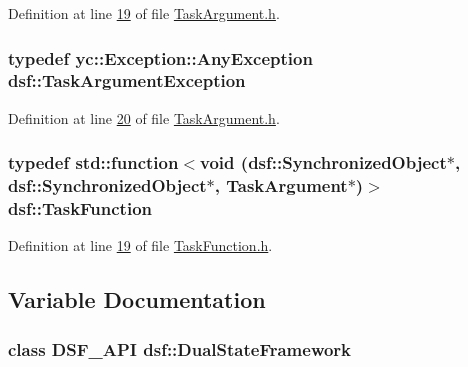 Definition at line \hyperlink{_task_argument_8h_source_l00019}{19} of file \hyperlink{_task_argument_8h_source}{Task\+Argument.\+h}.

\hypertarget{namespacedsf_af54027177bbfc0037be408a612d48b83}{}
\subsubsection[{Task\+Argument\+Exception}]{\setlength{\rightskip}{0pt plus 5cm}typedef {\bf yc\+::\+Exception\+::\+Any\+Exception} {\bf dsf\+::\+Task\+Argument\+Exception}}\label{namespacedsf_af54027177bbfc0037be408a612d48b83}


Definition at line \hyperlink{_task_argument_8h_source_l00020}{20} of file \hyperlink{_task_argument_8h_source}{Task\+Argument.\+h}.

\hypertarget{namespacedsf_aa16e735f29587f4485b56fc46746f7a9}{}
\subsubsection[{Task\+Function}]{\setlength{\rightskip}{0pt plus 5cm}typedef std\+::function$<$void ({\bf dsf\+::\+Synchronized\+Object}$\ast$, {\bf dsf\+::\+Synchronized\+Object}$\ast$, {\bf Task\+Argument}$\ast$)$>$ {\bf dsf\+::\+Task\+Function}}\label{namespacedsf_aa16e735f29587f4485b56fc46746f7a9}


Definition at line \hyperlink{_task_function_8h_source_l00019}{19} of file \hyperlink{_task_function_8h_source}{Task\+Function.\+h}.



\subsection{Variable Documentation}
\hypertarget{namespacedsf_a68ac3b6a0526bfa7f6a412918afb1841}{}
\subsubsection[{Dual\+State\+Framework}]{\setlength{\rightskip}{0pt plus 5cm}class {\bf D\+S\+F\+\_\+\+A\+P\+I} {\bf dsf\+::\+Dual\+State\+Framework}}\label{namespacedsf_a68ac3b6a0526bfa7f6a412918afb1841}


